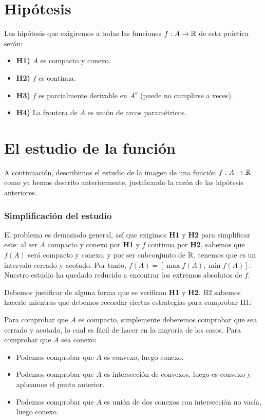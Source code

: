 \section{Hipótesis}
\noindent
Las hipótesis que exigiremos a todas las funciones $f:A \rightarrow \mathbb R$ de esta práctica serán:

\begin{itemize}
    \item \textbf{H1)} $A$ es compacto y conexo.
    \item \textbf{H2)} $f$ es continua.
    \item \textbf{H3)} $f$ es parcialmente derivable en $A^o$ (puede no cumplirse a veces).
    \item \textbf{H4)} La frontera de $A$ es unión de arcos paramétricos.
\end{itemize}

\section{El estudio de la función}
\noindent
A continuación, describimos el estudio de la imagen de una función $f:A \rightarrow \mathbb R$ como ya hemos descrito anteriormente, justificando la razón de las hipótesis anteriores.

\subsubsection{Simplificación del estudio}
\noindent
El problema es demasiado general, así que exigimos \textbf{H1} y \textbf{H2} para simplificar este: al ser $A$ compacto y conexo por \textbf{H1} y $f$ continua por \textbf{H2}, sabemos que $f(A)$ será compacto y conexo, y por ser subconjunto de $\mathbb R$, tenemos que es un intervalo cerrado y acotado. Por tanto, $f(A) = [\max{f(A)}, \min{f(A)}]$. Nuestro estudio ha quedado reducido a encontrar los extremos absolutos de $f$.
\vspace{.5cm}

\noindent
Debemos justificar de alguna forma que se verifican \textbf{H1} y \textbf{H2}. H2 sabemos hacerlo mientras que debemos recordar ciertas estrategias para comprobar H1:
\vspace{.5cm}

\noindent
Para comprobar que $A$ es compacto, simplemente deberemos comprobar que sea cerrado y acotado, lo cual es fácil de hacer en la mayoría de los casos. Para comprobar que $A$ sea conexo:
\begin{itemize}
    \item Podemos comprobar que $A$ es convexo, luego conexo.
    \item Podemos comprobar que $A$ es intersección de convexos, luego es convexo y aplicamos el punto anterior.
    \item Podemos comprobar que $A$ es unión de dos conexos con intersección no vacía, luego conexo.
\end{itemize}

